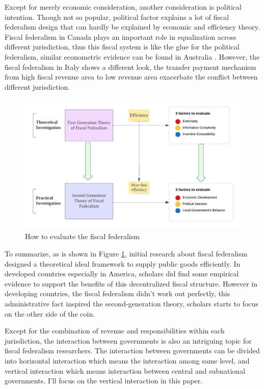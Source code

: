 Except for merely economic consideration, another consideration is political intention. Though not so popular, political factor explains a lot of fiscal federalism design that can hardly be explained by economic and efficiency theory. Fiscal federalism in Canada plays an important role in equalization across different jurisdiction, thus this fiscal system is like the glue for the political federalism, similar econometric evidence can be found in Australia  \cite{oates2005toward}. However, the fiscal federalism in Italy shows a different look, the transfer payment mechanism from high fiscal revenue area to low revenue area exacerbate the conflict between different jurisdiction.

\begin{figure}[htb]
    \centering
    \includegraphics[scale=1]{Chapter-2/Figures/how to evaluate the fiscal federalism.jpeg}
    \caption[How to evaluate the fiscal federalism]{How to evaluate the fiscal federalism
        \texttt{} }
    \label{Figure 2.1}
\end{figure}


To summarize, as is shown in Figure \ref*{Figure 2.1}, initial research about fiscal federalism designed a theoretical ideal framework to supply public goods efficiently. In developed countries especially in America, scholars did find some empirical evidence to support the benefits of this decentralized fiscal structure. However in developing countries, the fiscal federalism didn't work out perfectly, this administrative fact inspired the second-generation theory, scholars starts to focus on the other side of the coin.

Except for the combination of revenue and responsibilities within each jurisdiction, the interaction between governments is also an intriguing topic for fiscal federalism researchers. The interaction between governments can be divided into horizontal interaction which means the interaction among same level, and vertical interaction which means interaction between central and subnational governments. I'll focus on the vertical interaction in this paper.

